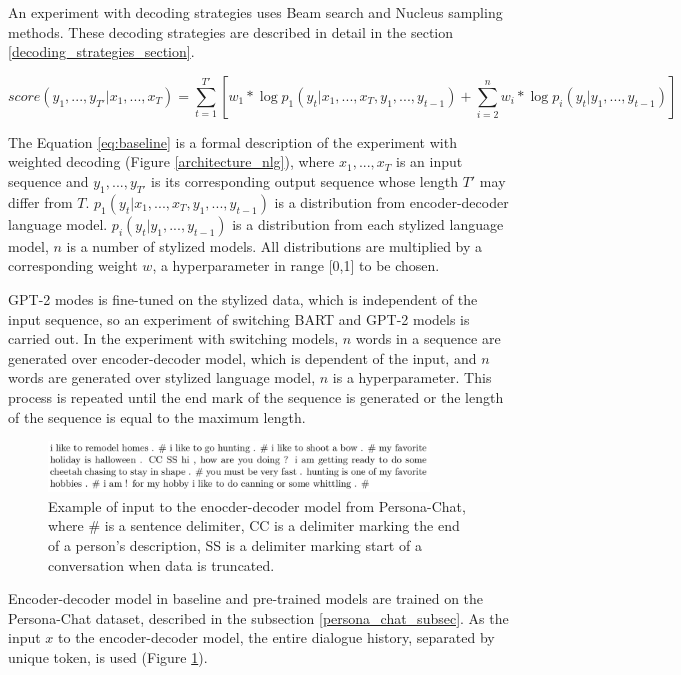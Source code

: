 An experiment with decoding strategies uses Beam search and Nucleus sampling methods. These decoding strategies are described in detail in the section \ref{decoding_strategies_section}.

\begin{equation} \label{eq:baseline}
score(y_1, ... , y_{T'}|x_1, ... , x_T) = \sum_{t=1}^{T'} [w_1 * \log p_1(y_t|x_1, ... , x_T, y_1, ... , y_{t-1}) + \sum_{i=2}^n w_i * \log p_i(y_t| y_1, ... , y_{t-1})]
\end{equation}

The Equation \ref{eq:baseline} is a formal description of the experiment with weighted decoding (Figure \ref{architecture_nlg}), where $x_1, ... , x_T$ is an input sequence and $y_1, ... , y_{T'}$ is its corresponding output sequence whose length $T'$ may differ from $T$. $p_1(y_t|x_1, ... , x_T, y_1, ... , y_{t-1})$ is a distribution from encoder-decoder language model. $p_i(y_t|y_1, ... , y_{t-1})$ is a distribution from each stylized language model, $n$ is a number of stylized models. All distributions are multiplied by a corresponding weight $w$, a hyperparameter in range [0,1] to be chosen.

GPT-2 modes is fine-tuned on the stylized data, which is independent of the input sequence, so an experiment of switching BART and GPT-2 models is carried out. In the experiment with switching models, $n$ words in a sequence are generated over encoder-decoder model, which is dependent of the input, and $n$ words are generated over stylized language model, $n$ is a hyperparameter. This process is repeated until the end mark of the sequence is generated or the length of the sequence is equal to the maximum length. 

\begin{figure}[ht]
  \centering
  \includegraphics[width=0.9\textwidth]{figures/persona_chat_ex.png}
  \caption{Example of input to the enocder-decoder model from Persona-Chat, where \# is a sentence delimiter, CC is a delimiter marking the end of a person’s description, SS is a delimiter marking start of a conversation when data is truncated.}
  \label{fig:persona_input}
\end{figure}

Encoder-decoder model in baseline and pre-trained models are trained on the Persona-Chat dataset, described in the subsection \ref{persona_chat_subsec}. As the input $x$ to the encoder-decoder model, the entire dialogue history, separated by unique token, is used (Figure \ref{fig:persona_input}).


